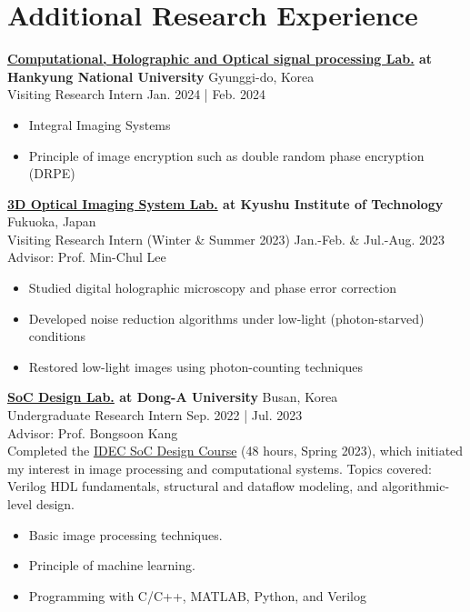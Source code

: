 \documentclass[a4paper,9pt]{extarticle}
\begin{document}
\section*{Additional Research Experience}

\noindent
\textbf{\href{https://3cholab.wordpress.com/정보/}{Computational, Holographic and Optical signal processing Lab.} at Hankyung National University} \hfill Gyunggi-do, Korea\\ %
Visiting Research Intern \hfill Jan. 2024 | Feb. 2024 %
\begin{itemize}
    \item Integral Imaging Systems
    \item Principle of image encryption such as double random phase encryption (DRPE)
\end{itemize}

\noindent
\textbf{\href{https://leelab.csn.kyutech.ac.jp}{3D Optical Imaging System Lab.} at Kyushu Institute of Technology} \hfill Fukuoka, Japan\\ %
Visiting Research Intern (Winter \& Summer 2023) \hfill Jan.-Feb. \& Jul.-Aug. 2023\\%
Advisor: Prof. Min-Chul Lee 
\begin{itemize}
    \item Studied digital holographic microscopy and phase error correction  
    \item Developed noise reduction algorithms under low-light (photon-starved) conditions  
    \item Restored low-light images using photon-counting techniques
\end{itemize}

\noindent
\textbf{\href{https://soc.donga.ac.kr/soc/Main.do}{SoC Design Lab.} at Dong-A University} \hfill Busan, Korea\\ %
Undergraduate Research Intern \hfill Sep. 2022 | Jul. 2023 \\
Advisor: Prof. Bongsoon Kang \\
Completed the \href{https://github.com/user-attachments/assets/583762df-f208-4216-b836-a6a1921ec34b}{IDEC SoC Design Course} (48 hours, Spring 2023), which initiated my interest in image processing and computational systems.
Topics covered: Verilog HDL fundamentals, structural and dataflow modeling, and algorithmic-level design.
\begin{itemize}
    \item Basic image processing techniques.
    \item Principle of machine learning.
    \item Programming with C/C++, MATLAB, Python, and Verilog
\end{itemize}
\end{document}
